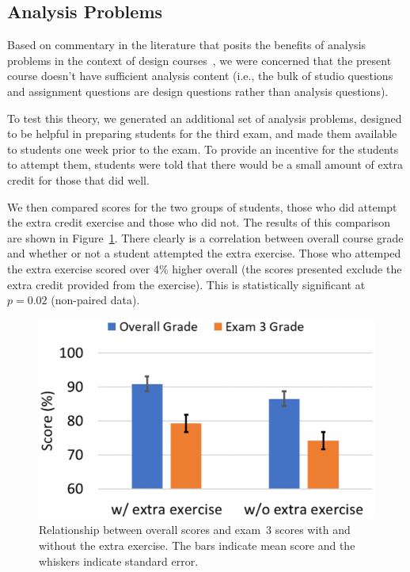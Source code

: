 \subsection{Analysis Problems}

Based on commentary in the literature that posits the benefits of
analysis problems in the context of design courses~\cite{wjbo01},
we were concerned that the present
course doesn't have sufficient analysis content (i.e., the bulk of
studio questions and assignment questions are design questions rather
than analysis questions).

To test this theory, we generated an additional set of analysis problems,
designed to be helpful in preparing students for the third exam, and
made them available to students one week prior to the exam.  To provide
an incentive for the students to attempt them, students were told that
there would be a small amount of extra credit for those that did well.

We then compared scores for the two groups of students, those who did
attempt the extra credit exercise and those who did not.  The results
of this comparison are shown in Figure~\ref{fig:scores}.
There clearly is a correlation between overall course grade and
whether or not a student attempted the extra exercise.
Those who attemped the extra exercise scored over 4\% higher overall
(the scores presented exclude the extra credit provided from the
exercise).  This is statistically significant at $p = 0.02$ (non-paired data).

\begin{figure}[ht]
\centering
\includegraphics[width=\columnwidth]{scores}
\caption{Relationship between overall scores and exam~3 scores
with and without the extra exercise. The bars indicate mean score and
the whiskers indicate standard error.}
\label{fig:scores}
\end{figure}

